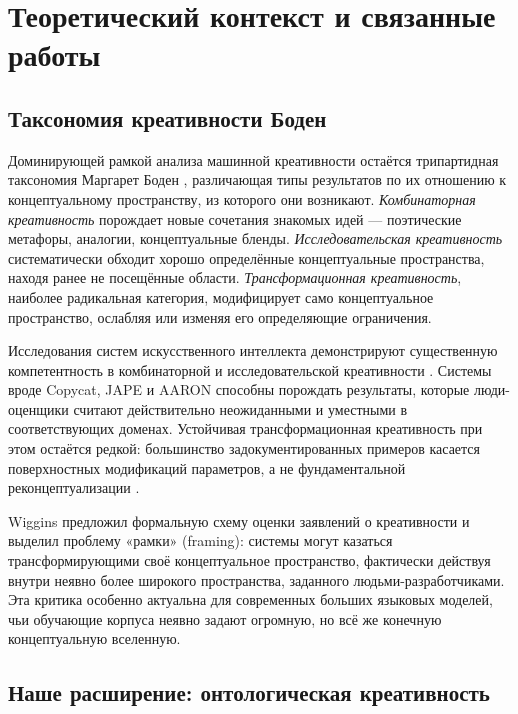 \documentclass[sn-mathphys-num]{sn-jnl}
\begin{document}
\section{Теоретический контекст и связанные работы}
\label{sec:related}

\subsection{Таксономия креативности Боден}

Доминирующей рамкой анализа машинной креативности остаётся трипартидная таксономия Маргарет Боден \cite{boden2004creative}, различающая типы результатов по их отношению к концептуальному пространству, из которого они возникают. \emph{Комбинаторная креативность} порождает новые сочетания знакомых идей --- поэтические метафоры, аналогии, концептуальные бленды. \emph{Исследовательская креативность} систематически обходит хорошо определённые концептуальные пространства, находя ранее не посещённые области. \emph{Трансформационная креативность}, наиболее радикальная категория, модифицирует само концептуальное пространство, ослабляя или изменяя его определяющие ограничения.

Исследования систем искусственного интеллекта демонстрируют существенную компетентность в комбинаторной и исследовательской креативности \cite{hofstadter1995fluid,cope1996experiments}. Системы вроде Copycat, JAPE и AARON способны порождать результаты, которые люди-оценщики считают действительно неожиданными и уместными в соответствующих доменах. Устойчивая трансформационная креативность при этом остаётся редкой: большинство задокументированных примеров касается поверхностных модификаций параметров, а не фундаментальной реконцептуализации \cite{boden2004creative}.

Wiggins \cite{wiggins2006preliminary} предложил формальную схему оценки заявлений о креативности и выделил проблему «рамки» (framing): системы могут казаться трансформирующими своё концептуальное пространство, фактически действуя внутри неявно более широкого пространства, заданного людьми-разработчиками. Эта критика особенно актуальна для современных больших языковых моделей, чьи обучающие корпуса неявно задают огромную, но всё же конечную концептуальную вселенную.

\subsection{Наше расширение: онтологическая креативность}
\end{document}
